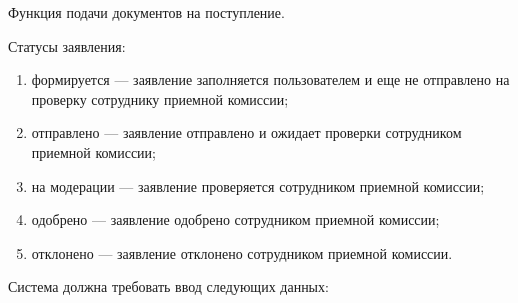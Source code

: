 Функция подачи документов на поступление.

Статусы заявления:

\begin{enumerate} 
  \item формируется — заявление заполняется пользователем и еще не отправлено на проверку сотруднику приемной комиссии;
  
  \item отправлено — заявление отправлено и ожидает проверки сотрудником приемной комиссии;
  
  \item на модерации — заявление проверяется сотрудником приемной комиссии;
  
  \item одобрено — заявление одобрено сотрудником приемной комиссии;
  
  \item отклонено — заявление отклонено сотрудником приемной комиссии.
\end{enumerate}

Система должна требовать ввод следующих данных:

